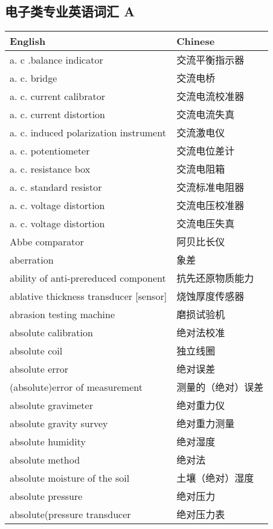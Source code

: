 \documentclass[
]{article}
\author{}
\date{}
\begin{document}
\hypertarget{ux7535ux5b50ux7c7bux4e13ux4e1aux82f1ux8bedux8bcdux6c47-a}{%
\subsection{电子类专业英语词汇
A}\label{ux7535ux5b50ux7c7bux4e13ux4e1aux82f1ux8bedux8bcdux6c47-a}}

\begin{longtable}[]{@{}ll@{}}
\toprule()
English & Chinese \\
\midrule()
\endhead
a. c .balance indicator & 交流平衡指示器 \\
a. c. bridge & 交流电桥 \\
a. c. current calibrator & 交流电流校准器 \\
a. c. current distortion & 交流电流失真 \\
a. c. induced polarization instrument & 交流激电仪 \\
a. c. potentiometer & 交流电位差计 \\
a. c. resistance box & 交流电阻箱 \\
a. c. standard resistor & 交流标准电阻器 \\
a. c. voltage distortion & 交流电压校准器 \\
a. c. voltage distortion & 交流电压失真 \\
Abbe comparator & 阿贝比长仪 \\
aberration & 象差 \\
ability of anti-prereduced component & 抗先还原物质能力 \\
ablative thickness transducer {[}sensor{]} & 烧蚀厚度传感器 \\
abrasion testing machine & 磨损试验机 \\
absolute calibration & 绝对法校准 \\
absolute coil & 独立线圈 \\
absolute error & 绝对误差 \\
(absolute)error of measurement & 测量的（绝对）误差 \\
absolute gravimeter & 绝对重力仪 \\
absolute gravity survey & 绝对重力测量 \\
absolute humidity & 绝对湿度 \\
absolute method & 绝对法 \\
absolute moisture of the soil & 土壤（绝对）湿度 \\
absolute pressure & 绝对压力 \\
absolute(pressure transducer & 绝对压力表 \\

\end{longtable}
\end{document}
